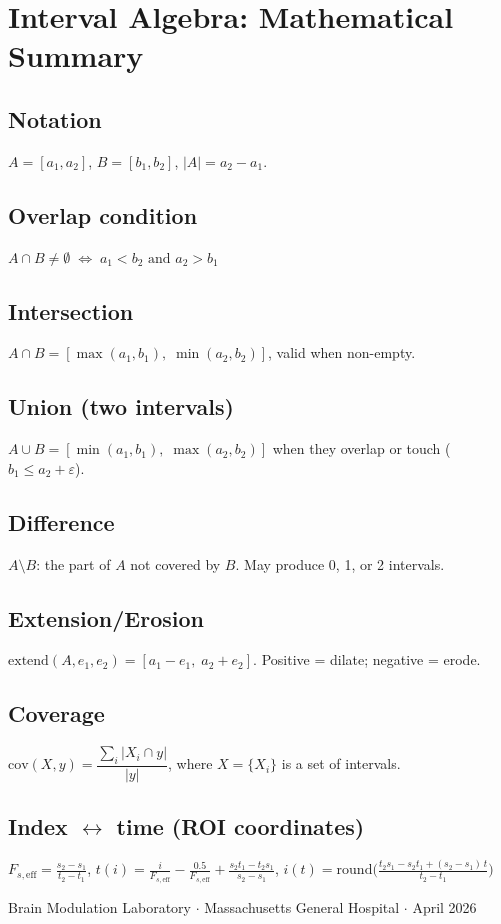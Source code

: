 \documentclass[11pt, a4paper]{article}
\begin{document}
\appendix
\section{Interval Algebra: Mathematical Summary}

\subsection*{Notation}
$A = [a_1, a_2]$, $B = [b_1, b_2]$, $|A| = a_2 - a_1$.

\subsection*{Overlap condition}
$A \cap B \neq \emptyset \;\Leftrightarrow\; a_1 < b_2 \text{ and } a_2 > b_1$

\subsection*{Intersection}
$A \cap B = [\max(a_1,b_1),\; \min(a_2,b_2)]$, valid when non-empty.

\subsection*{Union (two intervals)}
$A \cup B = [\min(a_1,b_1),\; \max(a_2,b_2)]$ when they overlap or touch ($b_1 \leq a_2 + \varepsilon$).

\subsection*{Difference}
$A \setminus B$: the part of $A$ not covered by $B$. May produce 0, 1, or 2 intervals.

\subsection*{Extension/Erosion}
$\mathrm{extend}(A, e_1, e_2) = [a_1 - e_1,\; a_2 + e_2]$. Positive = dilate; negative = erode.

\subsection*{Coverage}
$\mathrm{cov}(X, y) = \dfrac{\sum_i |X_i \cap y|}{|y|}$, where $X = \{X_i\}$ is a set of intervals.

\subsection*{Index $\leftrightarrow$ time (ROI coordinates)}
$F_{s,\mathrm{eff}} = \tfrac{s_2-s_1}{t_2-t_1}$, \quad
$t(i) = \tfrac{i}{F_{s,\mathrm{eff}}} - \tfrac{0.5}{F_{s,\mathrm{eff}}} + \tfrac{s_2 t_1 - t_2 s_1}{s_2-s_1}$, \quad
$i(t) = \mathrm{round}\!\bigl(\tfrac{t_2 s_1 - s_2 t_1 + (s_2-s_1)\,t}{t_2-t_1}\bigr)$

\vfill
\begin{center}
{\small\color{gray}
Brain Modulation Laboratory $\cdot$ Massachusetts General Hospital $\cdot$ April 2026}
\end{center}
\end{document}
